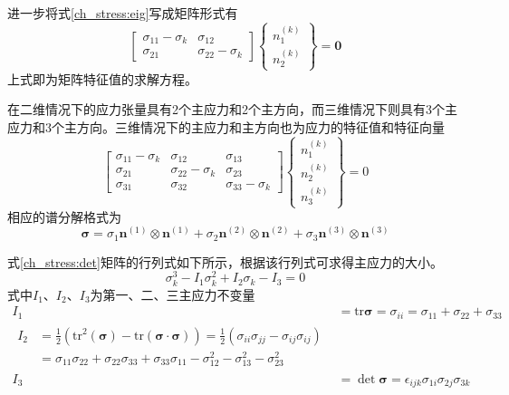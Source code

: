 进一步将式\eqref{ch_stress:eig}写成矩阵形式有
\begin{equation}
\begin{bmatrix}
    \sigma_{11} - \sigma_k & \sigma_{12} \\ \sigma_{21} & \sigma_{22} - \sigma_k
\end{bmatrix}
\begin{Bmatrix}
n_1^{(k)} \\ n_2^{(k)}
\end{Bmatrix} = \boldsymbol 0
\end{equation}
上式即为矩阵特征值的求解方程。\par
在二维情况下的应力张量具有2个主应力和2个主方向，而三维情况下则具有3个主应力和3个主方向。三维情况下的主应力和主方向也为应力的特征值和特征向量
\begin{equation}\label{ch_stress:det}
\begin{bmatrix}
    \sigma_{11}-\sigma_k & \sigma_{12} & \sigma_{13} \\
    \sigma_{21} & \sigma_{22}-\sigma_k & \sigma_{23} \\
    \sigma_{31} & \sigma_{32} & \sigma_{33}-\sigma_k
\end{bmatrix}
\begin{Bmatrix}
n^{(k)}_1 \\ n^{(k)}_2 \\ n^{(k)}_3
\end{Bmatrix} = 0
\end{equation}
相应的谱分解格式为
\begin{equation}
\boldsymbol \sigma = \sigma_1 \boldsymbol n^{(1)} \otimes \boldsymbol n^{(1)} + \sigma_2 \boldsymbol n^{(2)} \otimes \boldsymbol n^{(2)} + \sigma_3 \boldsymbol n^{(3)} \otimes \boldsymbol n^{(3)}
\end{equation}\par
式\eqref{ch_stress:det}矩阵的行列式如下所示，根据该行列式可求得主应力的大小。
\begin{equation}
    \sigma_k^{3} - I_1 \sigma_k^2 + I_2 \sigma_k - I_3 = 0
\end{equation}
式中$I_1$、$I_2$、$I_3$为第一、二、三主应力不变量
\begin{subequations}
\begin{align}
    I_1 &= \mathrm{tr} \boldsymbol \sigma = \sigma_{ii} = \sigma_{11} + \sigma_{22} + \sigma_{33} \\
    \begin{split}
    I_2 &= \frac{1}{2}(\mathrm{tr}^2(\boldsymbol \sigma)-\mathrm{tr}(\boldsymbol \sigma \cdot \boldsymbol \sigma)) = \frac{1}{2}(\sigma_{ii}\sigma_{jj} - \sigma_{ij}\sigma_{ij}) \\
        &= \sigma_{11}\sigma_{22} + \sigma_{22}\sigma_{33} + \sigma_{33}\sigma_{11} - \sigma_{12}^2 - \sigma_{13}^2 - \sigma_{23}^2
    \end{split} \\
    I_3 &= \det \boldsymbol \sigma = \epsilon_{ijk}\sigma_{1i}\sigma_{2j}\sigma_{3k}
\end{align}
\end{subequations}
